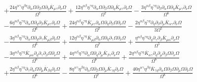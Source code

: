 \documentclass[10pt,letterpaper]{article}
\numberwithin{equation}{section}
\begin{document}
\begin{align}
&+ \frac{24 \eta^{\alpha \gamma} \eta^{\beta \eta} \partial_{\alpha}\Omega \partial_{\beta}\Omega \partial_{\eta}\overline{K}_{\mu \gamma} \partial_{\nu}\Omega}{\Omega^7} + \frac{12 \eta^{\alpha \beta} \eta^{\gamma \eta} \partial_{\alpha}\Omega \partial_{\beta}\Omega \partial_{\eta}\overline{K}_{\mu \gamma} \partial_{\nu}\Omega}{\Omega^7} -  \frac{3 \eta^{\alpha \beta} \eta^{\gamma \eta} \partial_{\beta}\partial_{\alpha}\Omega \partial_{\eta}\overline{K}_{\mu \gamma} \partial_{\nu}\Omega}{\Omega^6} \nonumber \\
&-  \frac{6 \eta^{\alpha \beta} \eta^{\gamma \eta} \partial_{\alpha}\Omega \partial_{\eta}\partial_{\beta}\overline{K}_{\mu \gamma} \partial_{\nu}\Omega}{\Omega^6} + \frac{24 \eta^{\alpha \beta} \eta^{\gamma \eta} \overline{K}_{\mu \gamma} \partial_{\alpha}\Omega \partial_{\eta}\partial_{\beta}\Omega \partial_{\nu}\Omega}{\Omega^7} -  \frac{2 \eta^{\alpha \beta} \eta^{\gamma \eta} \partial_{\eta}\partial_{\beta}\partial_{\mu}\overline{K}_{\alpha \gamma} \partial_{\nu}\Omega}{3 \Omega^5}\nonumber \\
& -  \frac{3 \eta^{\alpha \beta} \eta^{\gamma \eta} \partial_{\alpha}\Omega \partial_{\eta}\partial_{\gamma}\overline{K}_{\mu \beta} \partial_{\nu}\Omega}{\Omega^6} + \frac{12 \eta^{\alpha \beta} \eta^{\gamma \eta} \overline{K}_{\mu \beta} \partial_{\alpha}\Omega \partial_{\eta}\partial_{\gamma}\Omega \partial_{\nu}\Omega}{\Omega^7} + \frac{\eta^{\alpha \beta} \eta^{\gamma \eta} \partial_{\eta}\partial_{\gamma}\partial_{\beta}\overline{K}_{\mu \alpha} \partial_{\nu}\Omega}{\Omega^5} \nonumber \\
&-  \frac{3 \eta^{\alpha \beta} \eta^{\gamma \eta} \overline{K}_{\mu \alpha} \partial_{\eta}\partial_{\gamma}\partial_{\beta}\Omega \partial_{\nu}\Omega}{\Omega^6} + \frac{4 \eta^{\alpha \beta} \eta^{\gamma \eta} \partial_{\alpha}\Omega \partial_{\eta}\partial_{\mu}\overline{K}_{\beta \gamma} \partial_{\nu}\Omega}{\Omega^6} + \frac{2 \eta^{\alpha \beta} \eta^{\gamma \eta} \overline{K}_{\alpha \gamma} \partial_{\eta}\partial_{\mu}\partial_{\beta}\Omega \partial_{\nu}\Omega}{\Omega^6} \nonumber \\
&+ \frac{2 \eta^{\alpha \beta} \eta^{\gamma \eta} \partial_{\gamma}\partial_{\alpha}\Omega \partial_{\mu}\overline{K}_{\beta \eta} \partial_{\nu}\Omega}{\Omega^6} -  \frac{8 \eta^{\alpha \gamma} \eta^{\beta \eta} \partial_{\alpha}\Omega \partial_{\beta}\Omega \partial_{\mu}\overline{K}_{\gamma \eta} \partial_{\nu}\Omega}{\Omega^7} + \frac{40 \eta^{\alpha \gamma} \eta^{\beta \eta} \overline{K}_{\gamma \eta} \partial_{\alpha}\Omega \partial_{\beta}\Omega \partial_{\mu}\Omega \partial_{\nu}\Omega}{\Omega^8}\nonumber \\

\end{align}
\end{document}
